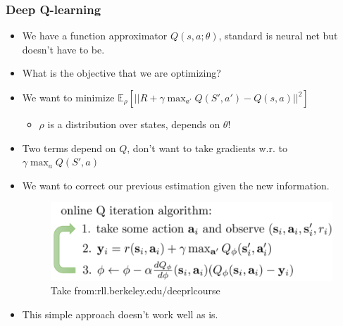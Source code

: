 \documentclass[handout]{beamer}
\begin{document}
\begin{frame}\frametitle{Deep Q-learning}\small

\begin{itemize}
	\item We have a function approximator $Q(s,a;\theta)$, standard is neural net but doesn't have to be.
	\onslide<2->\item What is the objective that we are optimizing?
	\onslide<3->\item  We want to minimize $\mathbb{E}_{\rho}[||R+\gamma\max_{a'} Q(S',a')-Q(s,a)||^2]$
	\begin{itemize}
		\item $\rho$ is a distribution over states, depends on $\theta$!
	\end{itemize}
	\item Two terms depend on $Q$, don't want to take gradients w.r. to $\gamma\max_aQ(S',a)$
	\onslide<5->\item We want to correct our previous estimation given the new information.
			\vspace{-0.2cm}
	\begin{figure}
		\includegraphics[width=0.85\linewidth]{Figures/Qalgo2}
		\vspace{-0.4cm}
		\caption{Take from:rll.berkeley.edu/deeprlcourse}
	\end{figure}
		\vspace{-0.5cm}
	\item This simple approach doesn't work well as is.
	
	
\end{itemize}
\end{frame}
\end{document}
